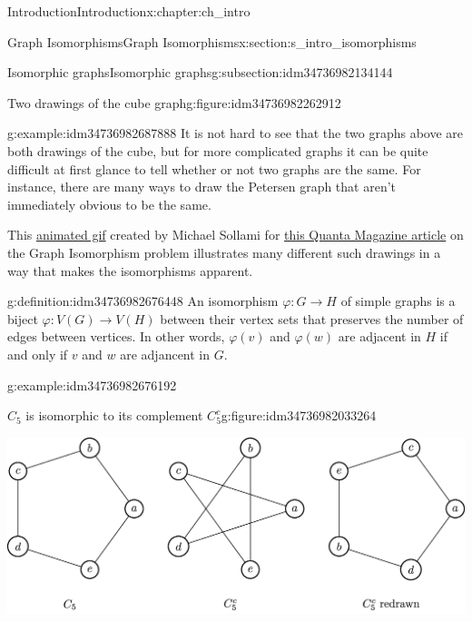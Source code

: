 \documentclass[oneside,10pt,]{book}
\numberwithin{equation}{section}
\begin{document}
\begin{chapterptx}{Introduction}{}{Introduction}{}{}{x:chapter:ch_intro}
\begin{sectionptx}{Graph Isomorphisms}{}{Graph Isomorphisms}{}{}{x:section:s_intro_isomorphisms}
\begin{subsectionptx}{Isomorphic graphs}{}{Isomorphic graphs}{}{}{g:subsection:idm34736982134144}
\begin{figureptx}{Two drawings of the cube graph}{g:figure:idm34736982262912}{}
\begin{image}{0.05}{0.9}{0.05}
{
}%
\end{image}%
\tcblower
\end{figureptx}%
\begin{example}{}{g:example:idm34736982687888}%
It is not hard to see that the two graphs above are both drawings of the cube, but for more complicated graphs it can be quite difficult at first glance to tell whether or not two graphs are the same.  For instance, there are many ways to draw the Petersen graph that aren't immediately obvious to be the same.%
\par
This \href{https://msollami.com/code/2014/12/24/graph-isomorphisms}{animated gif} created by Michael Sollami for \href{https://www.quantamagazine.org/algorithm-solves-graph-isomorphism-in-record-time-20151214/}{this Quanta Magazine article} on the Graph Isomorphism problem illustrates many different such drawings in a way that makes the isomorphisms apparent.%
\end{example}
\begin{definition}{}{g:definition:idm34736982676448}%
An isomorphism \(\varphi:G\to H\) of simple graphs is a biject \(\varphi:V(G)\to V(H)\) between their vertex sets that preserves the number of edges between vertices.  In other words, \(\varphi(v)\) and \(\varphi(w)\) are adjacent in \(H\) if and only if \(v\) and \(w\) are adjancent in \(G\).%
\end{definition}
\begin{example}{}{g:example:idm34736982676192}%
\begin{figureptx}{\(C_5\) is isomorphic to its complement \(C_5^c\)}{g:figure:idm34736982033264}{}%
\begin{image}{0.05}{0.9}{0.05}%
\includegraphics[width=\linewidth]{images/cycleandstar.jpg}

\end{image}
\end{figureptx}
\end{example}
\end{subsectionptx}
\end{sectionptx}
\end{chapterptx}
\end{document}
